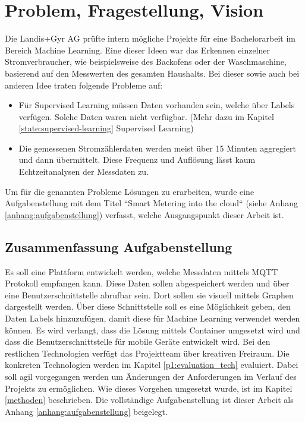 \chapter{Problem, Fragestellung, Vision}
\label{cap1}
Die Landis+Gyr AG prüfte intern mögliche Projekte für eine Bachelorarbeit im Bereich Machine Learning.
Eine dieser Ideen war das Erkennen einzelner Stromverbraucher, wie beispielsweise des Backofens oder der Waschmaschine,
basierend auf den Messwerten des gesamten Haushalts.
Bei dieser sowie auch bei anderen Idee traten folgende Probleme auf:
\begin{itemize}
      \item Für Supervised Learning müssen Daten vorhanden sein,
            welche über Labels verfügen. 
            Solche Daten waren nicht verfügbar. (Mehr dazu im Kapitel \ref{state:supervised-learning} Supervised Learning)
      \item Die gemessenen Stromzählerdaten werden meist über 15 Minuten aggregiert und dann übermittelt.
            Diese Frequenz und Auflösung lässt kaum Echtzeitanalysen der Messdaten zu.

\end{itemize}

Um für die genannten Probleme Lösungen zu erarbeiten, wurde eine Aufgabenstellung mit dem Titel ``Smart Metering into the cloud`` (siehe Anhang \ref{anhang:aufgabenstellung}) verfasst,
welche Ausgangspunkt dieser Arbeit ist.

\section{Zusammenfassung Aufgabenstellung}
\label{aufgabenstellung}

Es soll eine Plattform entwickelt werden, welche Messdaten mittels \ac{MQTT} Protokoll  empfangen kann.
Diese Daten sollen abgespeichert werden und über eine Benutzerschnittstelle abrufbar sein.
Dort sollen sie visuell mittels Graphen dargestellt werden.
Über diese Schnittstelle soll es eine Möglichkeit geben, den Daten Labels hinzuzufügen,
damit diese für Machine Learning verwendet werden können.
Es wird verlangt, dass die Lösung mittels Container umgesetzt wird und dass die Benutzerschnittstelle für mobile Geräte entwickelt wird.
Bei den restlichen Technologien verfügt das Projektteam über kreativen Freiraum.
Die konkreten Technologien werden im Kapitel \ref{p1:evaluation_tech} evaluiert.
Dabei soll agil vorgegangen werden um Änderungen der Anforderungen im Verlauf des Projekts zu ermöglichen.
Wie dieses Vorgehen umgesetzt wurde, ist im Kapitel \ref{methoden} beschrieben.
Die vollständige Aufgabenstellung ist dieser Arbeit als Anhang \ref{anhang:aufgabenstellung} beigelegt.

